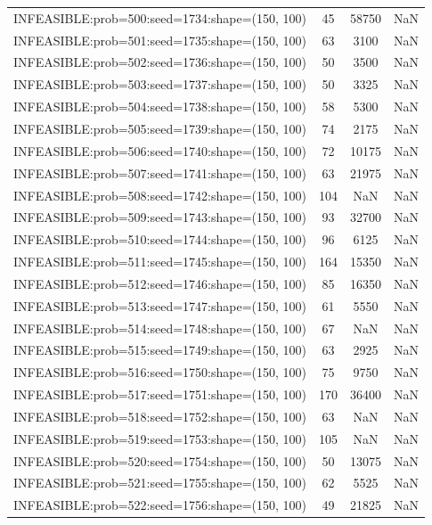 \begin{longtable}{lccc}
INFEASIBLE:prob=500:seed=1734:shape=(150, 100) &    45 & 58750 &    NaN \\
INFEASIBLE:prob=501:seed=1735:shape=(150, 100) &    63 &  3100 &    NaN \\
INFEASIBLE:prob=502:seed=1736:shape=(150, 100) &    50 &  3500 &    NaN \\
INFEASIBLE:prob=503:seed=1737:shape=(150, 100) &    50 &  3325 &    NaN \\
INFEASIBLE:prob=504:seed=1738:shape=(150, 100) &    58 &  5300 &    NaN \\
INFEASIBLE:prob=505:seed=1739:shape=(150, 100) &    74 &  2175 &    NaN \\
INFEASIBLE:prob=506:seed=1740:shape=(150, 100) &    72 & 10175 &    NaN \\
INFEASIBLE:prob=507:seed=1741:shape=(150, 100) &    63 & 21975 &    NaN \\
INFEASIBLE:prob=508:seed=1742:shape=(150, 100) &   104 &   NaN &    NaN \\
INFEASIBLE:prob=509:seed=1743:shape=(150, 100) &    93 & 32700 &    NaN \\
INFEASIBLE:prob=510:seed=1744:shape=(150, 100) &    96 &  6125 &    NaN \\
INFEASIBLE:prob=511:seed=1745:shape=(150, 100) &   164 & 15350 &    NaN \\
INFEASIBLE:prob=512:seed=1746:shape=(150, 100) &    85 & 16350 &    NaN \\
INFEASIBLE:prob=513:seed=1747:shape=(150, 100) &    61 &  5550 &    NaN \\
INFEASIBLE:prob=514:seed=1748:shape=(150, 100) &    67 &   NaN &    NaN \\
INFEASIBLE:prob=515:seed=1749:shape=(150, 100) &    63 &  2925 &    NaN \\
INFEASIBLE:prob=516:seed=1750:shape=(150, 100) &    75 &  9750 &    NaN \\
INFEASIBLE:prob=517:seed=1751:shape=(150, 100) &   170 & 36400 &    NaN \\
INFEASIBLE:prob=518:seed=1752:shape=(150, 100) &    63 &   NaN &    NaN \\
INFEASIBLE:prob=519:seed=1753:shape=(150, 100) &   105 &   NaN &    NaN \\
INFEASIBLE:prob=520:seed=1754:shape=(150, 100) &    50 & 13075 &    NaN \\
INFEASIBLE:prob=521:seed=1755:shape=(150, 100) &    62 &  5525 &    NaN \\
INFEASIBLE:prob=522:seed=1756:shape=(150, 100) &    49 & 21825 &    NaN \\

\end{longtable}
